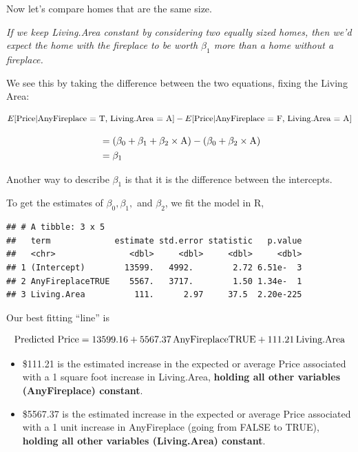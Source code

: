 \documentclass[
]{book}
\newenvironment{Shaded}{\begin{snugshade}}{\end{snugshade}}
\newcommand{\KeywordTok}[1]{\textcolor[rgb]{0.13,0.29,0.53}{\textbf{#1}}}
\newcommand{\NormalTok}[1]{#1}
\newcommand{\OperatorTok}[1]{\textcolor[rgb]{0.81,0.36,0.00}{\textbf{#1}}}
\newcommand{\StringTok}[1]{\textcolor[rgb]{0.31,0.60,0.02}{#1}}
\begin{document}
Now let's compare homes that are the same size.

\emph{If we keep Living.Area constant by considering two equally sized homes, then we'd expect the home with the fireplace to be worth \(\beta_1\) more than a home without a fireplace.}

We see this by taking the difference between the two equations, fixing the Living Area:

\[E[\hbox{Price}| \hbox{AnyFireplace = T, Living.Area = A}] - E[\hbox{Price}| \hbox{AnyFireplace = F, Living.Area = A}]\]

\begin{align*}
\,&= (\beta_0+\beta_1 + \beta_2 \times \hbox{A}) - ( \beta_0 + \beta_2 \times \hbox{A})\\
\,&= \beta_1
\end{align*}

Another way to describe \(\beta_1\) is that it is the difference between the intercepts.

To get the estimates of \(\beta_0,\beta_1,\) and \(\beta_2\), we fit the model in R,

\begin{Shaded}
\end{Shaded}

\begin{verbatim}
## # A tibble: 3 x 5
##   term             estimate std.error statistic   p.value
##   <chr>               <dbl>     <dbl>     <dbl>     <dbl>
## 1 (Intercept)        13599.   4992.        2.72 6.51e-  3
## 2 AnyFireplaceTRUE    5567.   3717.        1.50 1.34e-  1
## 3 Living.Area          111.      2.97     37.5  2.20e-225
\end{verbatim}

Our best fitting ``line'' is

\[\hbox{Predicted Price} = 13599.16 + 5567.37\,\hbox{AnyFireplaceTRUE} + 111.21\,\hbox{Living.Area}\]

\begin{itemize}
\item
  \$111.21 is the estimated increase in the expected or average Price associated with a 1 square foot increase in Living.Area, \textbf{holding all other variables (AnyFireplace) constant}.
\item
  \$5567.37 is the estimated increase in the expected or average Price associated with a 1 unit increase in AnyFireplace (going from FALSE to TRUE), \textbf{holding all other variables (Living.Area) constant}.
\end{itemize}
\end{document}
